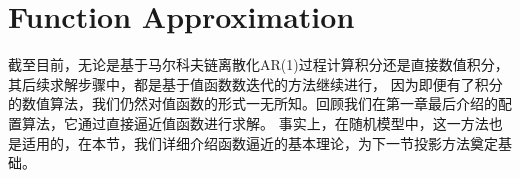 
\section{Function Approximation}    \label{sec-func-approximation}

截至目前，无论是基于马尔科夫链离散化AR(1)过程计算积分还是直接数值积分，其后续求解步骤中，都是基于值函数数迭代的方法继续进行，
因为即便有了积分的数值算法，我们仍然对值函数的形式一无所知。回顾我们在第一章最后介绍的配置算法，它通过直接逼近值函数进行求解。
事实上，在随机模型中，这一方法也是适用的，在本节，我们详细介绍函数逼近的基本理论，为下一节投影方法奠定基础。